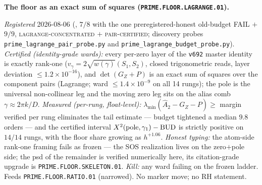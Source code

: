 \par\smallskip\noindent\textbf{The floor as an exact sum of
squares (\texttt{PRIME.FLOOR.LAGRANGE.01}).}
{\sloppy
\emph{Registered} 2026-08-06
(, $7/8$ with the one
preregistered-honest old-budget FAIL $+$ $9/9$,
\textsc{lagrange-concentrated} $+$ \textsc{pair-certified};
discovery probes \texttt{prime\_lagrange\_pair\_probe.py} and
\texttt{prime\_lagrange\_budget\_probe.py}).  \emph{Certified
(identity-grade wards):} every per-zero layer of the
\texttt{v692} master identity is exactly rank-one ($v_\gamma =
2\sqrt{w(\gamma)}(S_1, S_2)$, closed trigonometric reads, layer
deviation $\le1.2\times10^{-16}$), and $\det(G_Z+P)$ is an exact
sum of squares over the component pairs (Lagrange; ward
$\le1.4\times10^{-9}$ on all 14 rungs); the pole is the universal
non-collinear leg and the moving zero leg sits on the alias comb
$\gamma\approx2\pi k/D$.  \emph{Measured (per-rung, float-level):}
$\lambda_{\min}(\hat A_2 - G_Z - P)\ge$ margin verified per rung
eliminates the tail estimate --- budget tightened a median $9.8$
orders --- and the certified interval $X^2({\rm pole},\gamma_1) -
{\rm BUD}$ is strictly positive on $14/14$ rungs, with the
floor share growing as $h^{+1.06}$.  \emph{Honest typing:} the
atom-side rank-one framing fails as frozen --- the SOS
realization lives on the zero$+$pole side; the psd of the
remainder is verified numerically here, its citation-grade
upgrade is \texttt{PRIME.FLOOR.SKELETON.01}.  \emph{Kill:} any
ward failing on the frozen ladder.  Feeds
\texttt{PRIME.FLOOR.RATIO.01} (narrowed).  No marker move; no RH
statement.\par}


